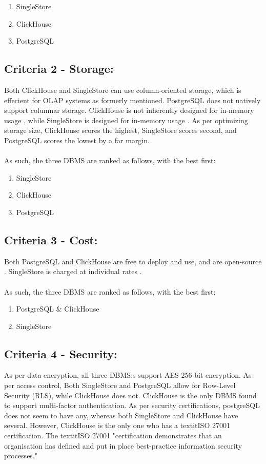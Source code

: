 \begin{enumerate}
    \item SingleStore
    \item ClickHouse
    \item PostgreSQL
\end{enumerate}
\subsection{Criteria 2 - Storage:}
Both ClickHouse and SingleStore can use column-oriented storage, which is effecient for OLAP systems as formerly mentioned. PostgreSQL does not natively support columnar storage.
ClickHouse is not inherently designed for in-memory usage \cite{clickhouseStorage}, while SingleStore is designed for in-memory usage \cite{singlestoreStorage}.
As per optimizing storage size, ClickHouse scores the highest, SingleStore scores second, and PostgreSQL scores the lowest by a  far margin.
\\\\
As such, the three DBMS are ranked as follows, with the best first:

\begin{enumerate}
    \item SingleStore
    \item ClickHouse
    \item PostgreSQL
\end{enumerate}
\subsection{Criteria 3 - Cost:}
Both PostgreSQL and ClickHouse are free to deploy and use, and are open-source \cite{clickhouseCost} \cite{postgresqlCost}. SingleStore is charged at individual rates \cite{singleStoreCost}.
\\\\
As such, the three DBMS are ranked as follows, with the best first:

\begin{enumerate}
    \item PostgreSQL \& ClickHouse
    \item SingleStore
\end{enumerate}
\subsection{Criteria 4 - Security:}
As per data encryption, all three DBMS:s support AES 256-bit encryption.
As per access control, Both SingleStore and PostgreSQL allow for Row-Level Security (RLS), while ClickHouse does not.
ClickHouse is the only DBMS found to support multi-factor authentication.
As per security certifications, postgreSQL does not seem to have any, whereas both SingleStore and ClickHouse have several.
However, ClickHouse is the only one who has a textit{ISO 27001} certification. The textit{ISO 27001} "certification demonstrates that an organisation has defined and put in place best-practice information security processes."

